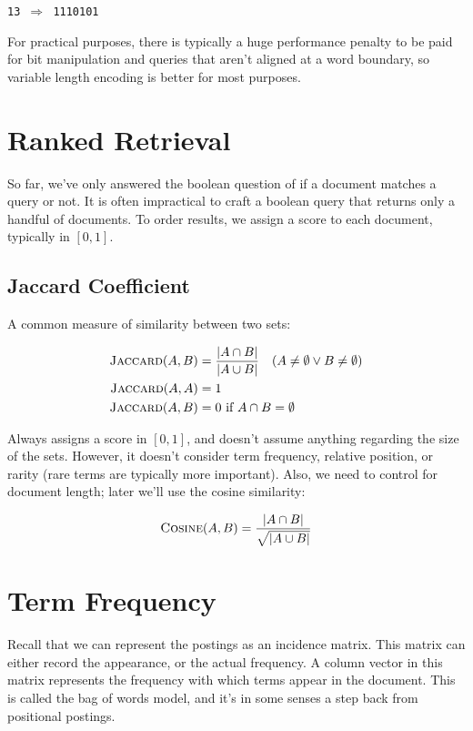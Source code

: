 \documentclass{idc_msc}
\begin{document}
\begin{center}
\texttt{13 \(\Rightarrow\) 1110101}
\end{center}

For practical purposes, there is typically a huge performance penalty to be paid for bit manipulation and queries that aren't aligned at a word boundary, so variable length encoding is better for most purposes.

\section{Ranked Retrieval}

So far, we've only answered the boolean question of if a document matches a query or not.
It is often impractical to craft a boolean query that returns only a handful of documents.
To order results, we assign a score to each document, typically in \([0,1]\).

\subsection{Jaccard Coefficient}

A common measure of similarity between two sets:

\[
\begin{aligned}
\textsc{Jaccard}(A,B) &= \frac{|A \cap B|}{|A \cup B|} \quad (A \ne \emptyset \lor B \ne \emptyset) \\
\textsc{Jaccard}(A,A) &= 1 \\
\textsc{Jaccard}(A,B) &= 0 \text{ if } A \cap B = \emptyset
\end{aligned}
\]

Always assigns a score in \([0,1]\), and doesn't assume anything regarding the size of the sets.
However, it doesn't consider term frequency, relative position, or rarity (rare terms are typically more important).
Also, we need to control for document length; later we'll use the cosine similarity:

\[\textsc{Cosine}(A,B) = \frac{|A \cap B|}{\sqrt{|A \cup B|}}\]

\section{Term Frequency}

Recall that we can represent the postings as an incidence matrix.
This matrix can either record the appearance, or the actual frequency.
A column vector in this matrix represents the frequency with which terms appear in the document.
This is called the bag of words model, and it's in some senses a step back from positional postings.
\end{document}
